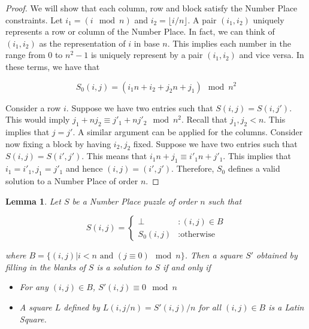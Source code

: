 \documentclass[11pt]{article}
\newtheorem{lemma}[theorem]{Lemma}
\begin{document}
\begin{proof}
We will show that each column, row and block satisfy the Number Place constraints. Let $i_1 = (i \mod n)$ and $i_2 = \lfloor i/n \rfloor$. A pair $(i_1, i_2)$ uniquely represents a row or column of the Number Place. In fact, we can think of $(i_1, i_2)$ as the representation of $i$ in base $n$. This implies each number in the range from $0$ to $n^2 -1$ is uniquely represent by a pair $(i_1, i_2)$ and vice versa. In these terms, we have that 

$$ S_0 (i, j) = (i_1 n + i_2 + j_2 n + j_1) \mod n^2 $$

Consider a row $i$. Suppose we have two entries such that $S(i,j) = S(i, j')$. This would imply $j_1 + n j_2 \equiv j'_1 + n j'_2 \mod n^2$. Recall that $j_1, j_2 < n$. This implies that $j = j'$. A similar argument can be applied for the columns. Consider now fixing a block by having $i_2, j_2$ fixed. Suppose we have two entries such that $S(i,j)=S(i',j')$. This means  that $i_1 n + j_1 \equiv i'_1 n + j'_1$. This implies that $i_1 = i'_1, j_1 = j'_1$ and hence $(i,j) = (i', j')$. Therefore, $S_0$ defines a valid solution to a Number Place of order $n$. 

\end{proof}

\begin{lemma}

Let $S$ be a Number Place puzzle of order $n$ such that

\begin{displaymath}
   S(i,j) = \left\{
     \begin{array}{lr}
       \perp & : (i,j) \in B\\
       S_0 (i,j) & : \text{otherwise}
     \end{array}
   \right.
\end{displaymath}

where $B = \{ (i,j) | i < n \text{ and } (j \equiv 0) \mod n \}$. Then a square $S'$ obtained by filling in the blanks of $S$ is a solution to $S$ if and only if 

\begin{itemize}
	\item For any $(i,j) \in B$, $S'(i,j) \equiv 0 \mod n$
	\item A square $L$ defined by $L(i, j/n) = S'(i,j)/n$ for all $(i, j) \in B$ is a Latin Square.  
\end{itemize} 

\end{lemma} 
\end{document}
